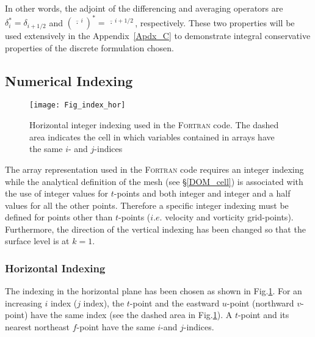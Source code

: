 \documentclass[NEMO_book]{subfiles}
\begin{document}
In other words, the adjoint of the differencing and averaging operators are 
$\delta_i^*=\delta_{i+1/2}$ and 
${(\overline{\,\cdot \,}^{\,i})}^*= \overline{\,\cdot\,}^{\,i+1/2}$, respectively. 
These two properties will be used extensively in the Appendix~\ref{Apdx_C} to 
demonstrate integral conservative properties of the discrete formulation chosen.

\subsection{Numerical Indexing}
\label{DOM_Num_Index}

\begin{figure}[!tb]  \begin{center}
\texttt{[image: Fig\_index\_hor]}
\caption{   \label{Fig_index_hor}    
Horizontal integer indexing used in the \textsc{Fortran} code. The dashed area indicates 
the cell in which variables contained in arrays have the same $i$- and $j$-indices}
\end{center}   \end{figure}

The array representation used in the \textsc{Fortran} code requires an integer 
indexing while the analytical definition of the mesh (see \S\ref{DOM_cell}) is 
associated with the use of integer values for $t$-points and both integer and 
integer and a half values for all the other points. Therefore a specific integer 
indexing must be defined for points other than $t$-points ($i.e.$ velocity and 
vorticity grid-points). Furthermore, the direction of the vertical indexing has 
been changed so that the surface level is at $k=1$.

\subsubsection{Horizontal Indexing}
\label{DOM_Num_Index_hor}

The indexing in the horizontal plane has been chosen as shown in Fig.\ref{Fig_index_hor}. 
For an increasing $i$ index ($j$ index), the $t$-point and the eastward $u$-point 
(northward $v$-point) have the same index (see the dashed area in Fig.\ref{Fig_index_hor}). 
A $t$-point and its nearest northeast $f$-point have the same $i$-and $j$-indices.
\end{document}
